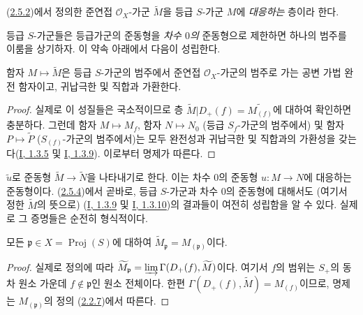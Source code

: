 \begin{definition}[2.5.3]
\label{II.2.5.3-ko}
(\hyperref[II.2.5.2-ko]{2.5.2})에서 정의한 준연접
$\mathcal{O}_X$-가군 $\widetilde{M}$을 등급 $S$-가군 $M$에
\emph{대응하는} 층이라 한다.
\end{definition}

등급 $S$-가군들은 등급가군의 준동형을 \emph{차수 $0$의} 준동형으로
제한하면 하나의 범주를 이룸을 상기하자. 이 약속 아래에서 다음이
성립한다.

\begin{proposition}[2.5.4]
\label{II.2.5.4-ko}
함자 $M\mapsto\widetilde{M}$은 등급 $S$-가군의 범주에서 준연접
$\mathcal{O}_X$-가군의 범주로 가는 공변 가법 완전 함자이고,
귀납극한 및 직합과 가환한다.
\end{proposition}

\begin{proof}
실제로 이 성질들은 국소적이므로 층
$\widetilde{M}|D_+(f)=\widetilde{M_{(f)}}$에 대하여 확인하면 충분하다.
그런데 함자 $M\mapsto M_f$, 함자 $N\mapsto N_0$ (등급
$S_f$-가군의 범주에서) 및 함자 $P\mapsto\widetilde{P}$
($S_{(f)}$-가군의 범주에서)는 모두 완전성과 귀납극한 및 직합과의
가환성을 갖는다(\hyperref[I.1.3.5-ko]{I, 1.3.5} 및
\hyperref[I.1.3.9-ko]{I, 1.3.9}). 이로부터 명제가 따른다.
\end{proof}

$\widetilde{u}$로 준동형 $\widetilde{M}\to\widetilde{N}$을 나타내기로
한다. 이는 차수 $0$의 준동형 $u:M\to N$에 대응하는 준동형이다.
(\hyperref[II.2.5.4-ko]{2.5.4})에서 곧바로, 등급 $S$-가군과 차수
$0$의 준동형에 대해서도 (여기서 정한 $\widetilde{M}$의 뜻으로)
(\hyperref[I.1.3.9-ko]{I, 1.3.9} 및
\hyperref[I.1.3.10-ko]{I, 1.3.10})의 결과들이 여전히 성립함을 알 수
있다. 실제로 그 증명들은 순전히 형식적이다.

\begin{proposition}[2.5.5]
\label{II.2.5.5-ko}
모든 $\mathfrak{p}\in X=\operatorname{Proj}(S)$에 대하여
$\widetilde{M}_{\mathfrak{p}}=M_{(\mathfrak{p})}$이다.
\end{proposition}

\begin{proof}
실제로 정의에 따라
$\widetilde{M}_{\mathfrak{p}}=
\varinjlim\Gamma(D_+(f),\widetilde{M})$이다. 여기서 $f$의 범위는
$S_+$의 동차 원소 가운데 $f\notin\mathfrak{p}$인 원소 전체이다. 한편
$\Gamma(D_+(f),\widetilde{M})=M_{(f)}$이므로, 명제는
$M_{(\mathfrak{p})}$의 정의
(\hyperref[II.2.2.7-ko]{2.2.7})에서 따른다.
\end{proof}

